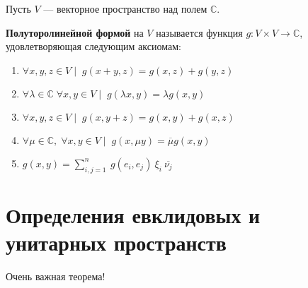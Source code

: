 \documentclass[12px]{report}
\begin{document}
\clearpage

Пусть $V$ — векторное пространство над полем $\mathbb{C}$.
\vspace{0.5cm}
\begin{shdef}
    \begin{definition}
    \leavevmode \newline
    
    \textbf{Полуторолинейной формой} на $V$ называется функция 
$g: V \times V \to \mathbb{C}$, удовлетворяющая следующим аксиомам:
\begin{enumerate}
    \item $\forall x,y,z \in V \mid \; g(x + y,z) = g(x,z) + g(y,z)$
    \item $\forall \lambda \in \mathbb{C} \; \forall x,y \in V \mid \; g(\lambda x, y) = \lambda g(x,y)$
    \item $\forall x,y,z \in V \mid \; g(x,y+z) = g(x,y) + g(x,z)$
    \item $\forall \mu \in \mathbb{C}, \; \forall x,y \in V \mid \; g(x, \mu y) = \overline{\mu} g(x,y)$
    \item $g(x,y) = \sum_{i,j = 1}^{n} \ g(e_{i}, e_{j}) \ \xi_{i} \ \overline{\nu_{j}}$
\end{enumerate}
    \end{definition}
\end{shdef}

\vspace{0.5cm}

\section{Определения евклидовых и унитарных пространств}



\begin{shth}
\begin{theorem}
    Очень важная теорема!
\end{theorem}
\end{shth}



\clearpage
\end{document}
